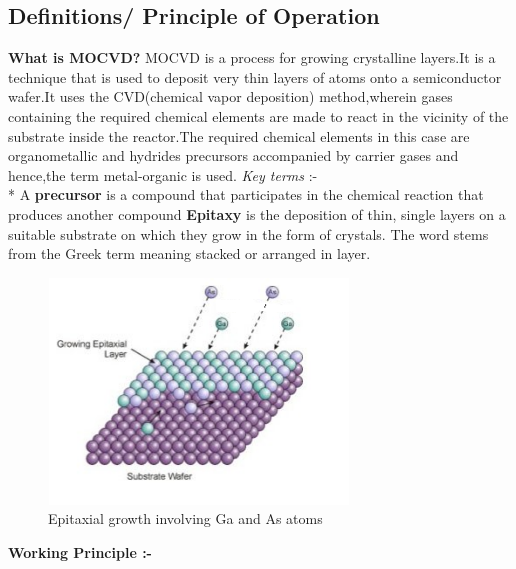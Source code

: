 \begin{flushleft}
\section{Definitions/ Principle of Operation}
\vspace{2mm}
\textbf{What is MOCVD?}
\vspace{3mm}
\newline
MOCVD is a process for growing crystalline layers.It is a technique that is used to deposit very thin layers of atoms onto a semiconductor wafer.It uses the CVD(chemical vapor deposition) method,wherein gases containing the required chemical elements are made to react in the vicinity of the substrate inside the reactor.The required chemical elements in this case are organometallic and hydrides precursors accompanied by carrier gases and hence,the term metal-organic is used.
\vspace{3mm}
\newline
\large{{\textit{Key terms} :-}}\\*
\vspace{3mm}
A \textbf{precursor} is a compound that participates in the chemical reaction that produces another compound
\vspace{3mm}
\newline
\textbf{Epitaxy} is the deposition of thin, single layers on a suitable substrate on which they grow in the form of crystals. The word stems from the Greek term  meaning stacked or arranged in layer. 
\vspace{5mm}
\newline
\begin{figure}[h!] 
	\centering
	\includegraphics[width=8cm, height=6cm]{images/epitaxy.png} 
	\caption{Epitaxial growth involving Ga and As atoms}
	\label{fig:img2} 
\end{figure} 
\vspace{6mm}
\newline
\textbf{Working Principle :-}
\vspace{3mm}

\end{flushleft}
